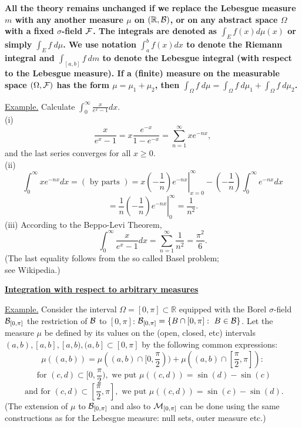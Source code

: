 \documentclass[a4paper,10pt]{article}
\def\RR{\mathbb{R}}
\newcommand{\1}[1]{\mathbf{1}_{\{#1\}}}
\begin{document}
{\Large\bf All the theory remains unchanged if we replace the Lebesgue measure $m$ with any another measure $\mu$ on $(\RR,{\cal B})$, or on any abstract space $\Omega$ with a fixed $\sigma$-field $\cal F$. The integrals are denoted as $\displaystyle \int_E f(x) d\mu(x)$ or simply $\int_E f~d\mu$. We use notation $\int_a^b f(x)dx$ to denote the Riemann integral and $\int_{[a,b]} f~dm$ to denote the Lebesgue integral (with respect to the Lebesgue measure). If a (finite) measure on the measurable space $(\Omega,{\cal F})$ has the form $\mu=\mu_1+\mu_2$, then $\int_\Omega f~d\mu=\int_\Omega f~d\mu_1+\int_\Omega f~d\mu_2$.}
\vspace{3mm}

\underline{Example.} Calculate $\int_0^\infty\frac{x}{e^x-1}dx$.\\
(i)
  $$\frac{x}{e^x-1}=x\frac{e^{-x}}{1-e^{-x}}=\sum_{n=1}^\infty x e^{-nx},$$
and the last series converges for all $x\ge 0$.\\
(ii)
  $$\int_0^\infty x e^{-nx}dx=(\mbox{ by parts })=\left.x(-\frac{1}{n}) e^{-nx}\right|_{x=0}^\infty - (-\frac{1}{n})\int_0^\infty e^{-nx}dx$$
  $$=\left.\frac{1}{n}(-\frac{1}{n}) e^{-nx}\right|_0^\infty=\frac{1}{n^2}.$$
(iii) According to the Beppo-Levi Theorem,
  $$\int_0^\infty \frac{x}{e^x-1} dx=\sum_{n=1}^\infty \frac{1}{n^2}=\frac{\pi^2}{6}.$$
(The last equality follows from the so called Basel problem;\\ see Wikipedia.) \vspace{1mm}

\begin{center}\bf\underline{Integration with respect to arbitrary measures} \end{center}\vspace{1mm}

\underline{Example.} Consider the interval $\Omega=[0,\pi]\subset \RR$ equipped with the Borel $\sigma$-field ${\cal B}_{[0,\pi]}$ the restriction of $\cal B$ to $[0,\pi]$: ${\cal B}_{[0,\pi]}=\{B\cap[0,\pi]:~B\in{\cal B}\}$. Let the measure $\mu$ be defined by its values on the (open, closed, etc) intervals $(a,b),[a,b],[a,b),(a,b]\subset [0,\pi]$ by the following common expressions:
$$\mu((a,b))=\mu((a,b)\cap [0,\frac{\pi}{2}))+\mu((a,b)\cap[\frac{\pi}{2},\pi]):$$
$$\mbox{ for } (c,d)\subset [0,\frac{\pi}{2}), \mbox{ we put } \mu((c,d))=\sin(d)-\sin(c)$$
$$\mbox{ and for } (c,d)\subset [\frac{\pi}{2},\pi], \mbox{ we put } \mu((c,d))=\sin(c)-\sin(d).$$
(The extension of $\mu$ to ${\cal B}_{[0,\pi]}$ and also to ${\cal M}_{[0,\pi]}$ can be done using the same constructions as for the Lebesgue measure: null sets, outer measure etc.)
\end{document}
